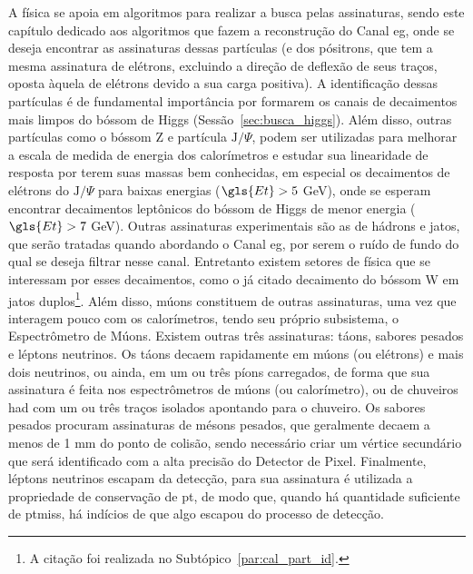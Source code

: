 A física se apoia em algoritmos
para realizar a busca pelas assinaturas, sendo este capítulo dedicado aos
algoritmos que fazem a reconstrução do Canal \gls{eg},
onde se deseja encontrar as assinaturas dessas partículas (e dos pósitrons, que
tem a mesma assinatura de elétrons, excluindo a direção de deflexão de seus
traços, oposta àquela de elétrons devido a sua carga positiva). A identificação
dessas partículas é de fundamental importância por formarem os canais de
decaimentos mais limpos do bóssom de Higgs (Sessão~\ref{sec:busca_higgs}). Além
disso, outras partículas como o bóssom Z e partícula $\text{J}/\Psi$, podem ser
utilizadas para melhorar a escala de medida de energia dos calorímetros e
estudar sua linearidade de resposta por terem suas massas bem conhecidas, 
em especial os decaimentos de elétrons do
$\text{J}/\Psi$ para baixas energias ($\gls{Et} > 5$ GeV), onde se esperam encontrar 
decaimentos leptônicos do bóssom de Higgs de menor energia ($\gls{Et} > 7$ GeV).
Outras assinaturas experimentais são as de hádrons e jatos, que serão tratadas
quando abordando o Canal \gls{eg}, por serem o ruído de fundo do qual se deseja
filtrar nesse canal. Entretanto existem setores de física que se
interessam por esses decaimentos, como o já citado decaimento do bóssom W em jatos
duplos\footnote{A citação foi realizada no Subtópico~\ref{par:cal_part_id}.}. 
Além disso, múons constituem de outras assinaturas, uma vez que interagem
pouco com os calorímetros, tendo seu próprio subsistema, o Espectrômetro de
Múons. Existem outras três assinaturas:
táons, sabores pesados e léptons neutrinos. Os táons decaem
rapidamente em múons (ou elétrons) e mais dois neutrinos, ou ainda, em um ou três
píons carregados, de forma que sua assinatura é
feita nos espectrômetros de múons (ou calorímetro), ou de chuveiros \gls{had} com um ou três
traços isolados apontando para o chuveiro. Os sabores pesados procuram
assinaturas de mésons pesados, que geralmente decaem a menos de 1 mm do ponto de
colisão, sendo necessário criar um vértice secundário que será identificado com
a alta precisão do Detector de Pixel. Finalmente, léptons neutrinos escapam da
detecção, para sua assinatura é utilizada a propriedade de conservação de
\gls{pt}, de modo que, quando há quantidade suficiente de \gls{ptmiss}, há indícios
de que algo escapou do processo de detecção.

